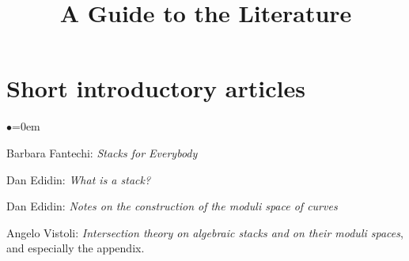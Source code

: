 

%


\title{A Guide to the Literature}

\maketitle

\label{section-phantom}

\tableofcontents

\section{Short introductory articles}
\label{section-short-introductions}


\begin{list}{$\bullet$}{\leftmargin=0em}
\item Barbara Fantechi: \emph{Stacks for Everybody} \cite{fantechi_stacks}
\smallskip
\item Dan Edidin: \emph{What is a stack?} \cite{edidin_whatis}
\smallskip
\item Dan Edidin: \emph{Notes on the construction of the moduli space of 
curves} \cite{edidin_notes}
\smallskip
\item Angelo Vistoli: \emph{Intersection theory on algebraic 
stacks and on their moduli spaces}, and especially the appendix.
\cite{vistoli_intersection}
\end{list}


